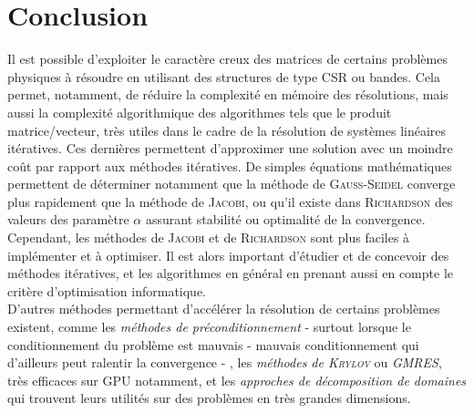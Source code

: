 \documentclass[12pt]{report}
\begin{document}
\section{Conclusion}

Il est possible d'exploiter le caractère creux des matrices de certains problèmes physiques à résoudre en utilisant des structures de type CSR ou bandes. Cela permet, notamment, de réduire la complexité en mémoire des résolutions, mais aussi la complexité algorithmique des algorithmes tels que le produit matrice/vecteur, très utiles dans le cadre de la résolution de systèmes linéaires itératives. Ces dernières permettent d'approximer une solution avec un moindre coût par rapport aux méthodes itératives. De simples équations mathématiques permettent de déterminer notamment que la méthode de \textsc{Gauss-Seidel} converge plus rapidement que la méthode de \textsc{Jacobi}, ou qu'il existe dans \textsc{Richardson} des valeurs des paramètre $\alpha$ assurant stabilité ou optimalité de la convergence. Cependant, les méthodes de \textsc{Jacobi} et de \textsc{Richardson} sont plus faciles à implémenter et à optimiser. Il est alors important d'étudier et de concevoir des méthodes itératives, et les algorithmes en général en prenant aussi en compte le critère d'optimisation informatique.\\
D'autres méthodes permettant d'accélérer la résolution de certains problèmes existent, comme les \textit{méthodes de préconditionnement} - surtout lorsque le conditionnement du problème est mauvais - mauvais conditionnement qui d'ailleurs peut ralentir la convergence - , les \textit{méthodes de \textsc{Krylov}} ou \textit{GMRES}, très efficaces sur GPU notamment, et les \textit{approches de décomposition de domaines} qui trouvent leurs utilités sur des problèmes en très grandes dimensions.
\end{document}
